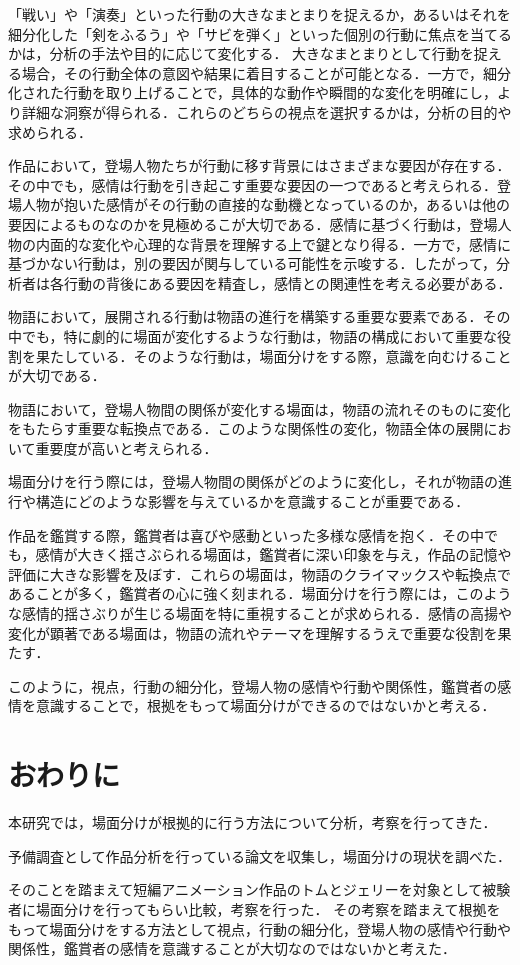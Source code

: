 「戦い」や「演奏」といった行動の大きなまとまりを捉えるか，あるいはそれを細分化した「剣をふるう」や「サビを弾く」といった個別の行動に焦点を当てるかは，分析の手法や目的に応じて変化する． 大きなまとまりとして行動を捉える場合，その行動全体の意図や結果に着目することが可能となる．一方で，細分化された行動を取り上げることで，具体的な動作や瞬間的な変化を明確にし，より詳細な洞察が得られる．これらのどちらの視点を選択するかは，分析の目的や求められる．

作品において，登場人物たちが行動に移す背景にはさまざまな要因が存在する．その中でも，感情は行動を引き起こす重要な要因の一つであると考えられる．登場人物が抱いた感情がその行動の直接的な動機となっているのか，あるいは他の要因によるものなのかを見極めるこが大切である．感情に基づく行動は，登場人物の内面的な変化や心理的な背景を理解する上で鍵となり得る．一方で，感情に基づかない行動は，別の要因が関与している可能性を示唆する．したがって，分析者は各行動の背後にある要因を精査し，感情との関連性を考える必要がある．

物語において，展開される行動は物語の進行を構築する重要な要素である．その中でも，特に劇的に場面が変化するような行動は，物語の構成において重要な役割を果たしている．そのような行動は，場面分けをする際，意識を向むけることが大切である．

物語において，登場人物間の関係が変化する場面は，物語の流れそのものに変化をもたらす重要な転換点である．このような関係性の変化，物語全体の展開において重要度が高いと考えられる．

場面分けを行う際には，登場人物間の関係がどのように変化し，それが物語の進行や構造にどのような影響を与えているかを意識することが重要である．

作品を鑑賞する際，鑑賞者は喜びや感動といった多様な感情を抱く．その中でも，感情が大きく揺さぶられる場面は，鑑賞者に深い印象を与え，作品の記憶や評価に大きな影響を及ぼす．これらの場面は，物語のクライマックスや転換点であることが多く，鑑賞者の心に強く刻まれる．場面分けを行う際には，このような感情的揺さぶりが生じる場面を特に重視することが求められる．感情の高揚や変化が顕著である場面は，物語の流れやテーマを理解するうえで重要な役割を果たす．

このように，視点，行動の細分化，登場人物の感情や行動や関係性，鑑賞者の感情を意識することで，根拠をもって場面分けができるのではないかと考える．

\section{おわりに}
本研究では，場面分けが根拠的に行う方法について分析，考察を行ってきた．

予備調査として作品分析を行っている論文を収集し，場面分けの現状を調べた．

そのことを踏まえて短編アニメーション作品のトムとジェリーを対象として被験者に場面分けを行ってもらい比較，考察を行った．
その考察を踏まえて根拠をもって場面分けをする方法として視点，行動の細分化，登場人物の感情や行動や関係性，鑑賞者の感情を意識することが大切なのではないかと考えた．
